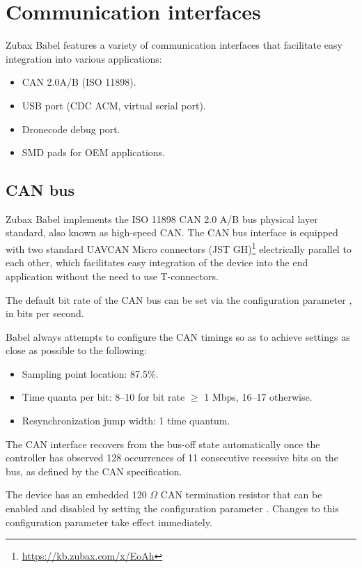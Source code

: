 \documentclass{zubaxdoc}
\begin{document}
\section{Communication interfaces}

Zubax Babel features a variety of communication interfaces that facilitate easy integration into various
applications:
\begin{itemize}
    \item CAN 2.0A/B (ISO 11898).
    \item USB port (CDC ACM, virtual serial port).
    \item Dronecode debug port.
    \item SMD pads for OEM applications.
\end{itemize}

\subsection{CAN bus}\label{sec:can_bus}

Zubax Babel implements the ISO 11898 CAN 2.0 A/B bus physical layer standard, also known as high-speed CAN.
The CAN bus interface is equipped with two standard
UAVCAN Micro connectors (JST GH)\footnote{\url{https://kb.zubax.com/x/EoAh}}
electrically parallel to each other,
which facilitates easy integration of the device into the end application without the need to use T-connectors.

The default bit rate of the CAN bus can be set via the configuration parameter ,
in bits per second.

Babel always attempts to configure the CAN timings so as to achieve settings as close as possible to the
following:
\begin{itemize}
    \item Sampling point location: 87.5\%.
    \item Time quanta per bit: 8--10 for bit rate $\geq$ 1 Mbps, 16--17 otherwise.
    \item Resynchronization jump width: 1 time quantum.
\end{itemize}

The CAN interface recovers from the bus-off state automatically once the controller has
observed 128 occurrences of 11 consecutive recessive bits on the bus, as defined by the CAN specification.

The device has an embedded 120 $\Omega$ CAN termination resistor that can be enabled and disabled
by setting the configuration parameter .
Changes to this configuration parameter take effect immediately.
\end{document}
